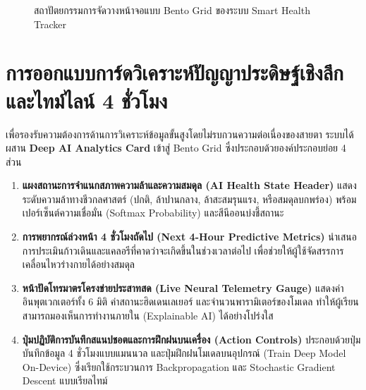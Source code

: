 \begin{figure}[H]
\caption{สถาปัตยกรรมการจัดวางหน้าจอแบบ Bento Grid ของระบบ Smart Health Tracker}
\label{fig:bento_grid_architecture}
\end{figure}

\section{การออกแบบการ์ดวิเคราะห์ปัญญาประดิษฐ์เชิงลึกและไทม์ไลน์ 4 ชั่วโมง}
เพื่อรองรับความต้องการด้านการวิเคราะห์ข้อมูลขั้นสูงโดยไม่รบกวนความต่อเนื่องของสายตา ระบบได้ผสาน \textbf{Deep AI Analytics Card} เข้าสู่ Bento Grid ซึ่งประกอบด้วยองค์ประกอบย่อย 4 ส่วน
\begin{enumerate}
    \item \textbf{แผงสถานะการจำแนกสภาพความล้าและความสมดุล (AI Health State Header)} แสดงระดับความล้าทางชีวกลศาสตร์ (ปกติ, ล้าปานกลาง, ล้าสะสมรุนแรง, หรือสมดุลบกพร่อง) พร้อมเปอร์เซ็นต์ความเชื่อมั่น (Softmax Probability) และสีนีออนบ่งชี้สถานะ
    \item \textbf{การพยากรณ์ล่วงหน้า 4 ชั่วโมงถัดไป (Next 4-Hour Predictive Metrics)} นำเสนอการประเมินก้าวเดินและแคลอรีที่คาดว่าจะเกิดขึ้นในช่วงเวลาต่อไป เพื่อช่วยให้ผู้ใช้จัดสรรการเคลื่อนไหวร่างกายได้อย่างสมดุล
    \item \textbf{หน้าปัดโทรมาตรโครงข่ายประสาทสด (Live Neural Telemetry Gauge)} แสดงค่าอินพุตเวกเตอร์ทั้ง 6 มิติ ค่าสถานะฮิดเดนเลเยอร์ และจำนวนพารามิเตอร์ของโมเดล ทำให้ผู้เรียนสามารถมองเห็นการทำงานภายใน (Explainable AI) ได้อย่างโปร่งใส
    \item \textbf{ปุ่มปฏิบัติการบันทึกสแนปชอตและการฝึกฝนบนเครื่อง (Action Controls)} ประกอบด้วยปุ่มบันทึกข้อมูล 4 ชั่วโมงแบบแมนนวล และปุ่มฝึกฝนโมเดลบนอุปกรณ์ (Train Deep Model On-Device) ซึ่งเรียกใช้กระบวนการ Backpropagation และ Stochastic Gradient Descent แบบเรียลไทม์
\end{enumerate}

